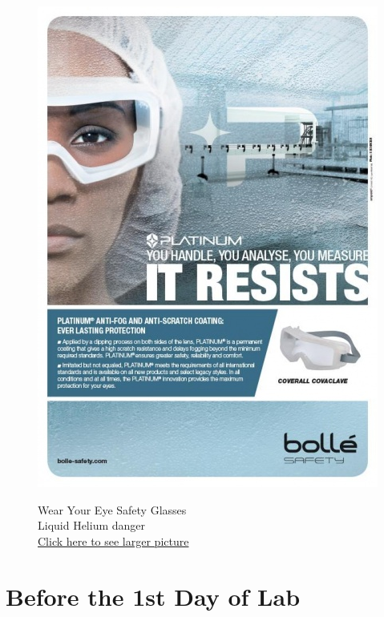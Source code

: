 \documentclass{../lab}
\begin{document}
\begin{figure}[!htb]
  \href{http://experimentationlab.berkeley.edu/sites/default/files/upimages/5_eye-wear-face.jpg}{\includegraphics[width=\linewidth,keepaspectratio]{images/5_eye-wear-face.jpg}}
  \caption{Wear Your Eye Safety Glasses \\ Liquid Helium danger \\ \href{http://experimentationlab.berkeley.edu/sites/default/files/upimages/5_eye-wear-face.jpg}{Click here to see larger picture}}\label{fig:5_eye-wear-face.jpg}
\endminipage
\end{figure}







\section{Before the 1st Day of Lab}
\end{document}
